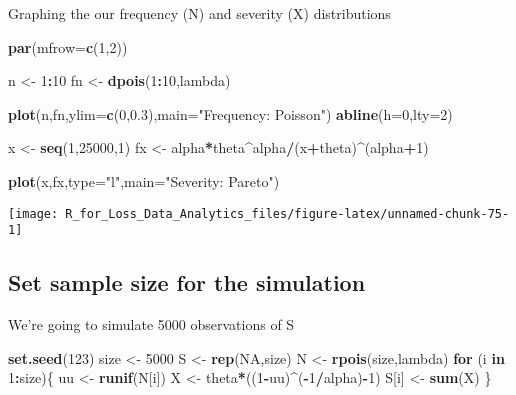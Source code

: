 \documentclass[]{book}
\newenvironment{Shaded}{\begin{snugshade}}{\end{snugshade}}
\newcommand{\KeywordTok}[1]{\textcolor[rgb]{0.13,0.29,0.53}{\textbf{#1}}}
\newcommand{\DataTypeTok}[1]{\textcolor[rgb]{0.13,0.29,0.53}{#1}}
\newcommand{\DecValTok}[1]{\textcolor[rgb]{0.00,0.00,0.81}{#1}}
\newcommand{\FloatTok}[1]{\textcolor[rgb]{0.00,0.00,0.81}{#1}}
\newcommand{\StringTok}[1]{\textcolor[rgb]{0.31,0.60,0.02}{#1}}
\newcommand{\OtherTok}[1]{\textcolor[rgb]{0.56,0.35,0.01}{#1}}
\newcommand{\ControlFlowTok}[1]{\textcolor[rgb]{0.13,0.29,0.53}{\textbf{#1}}}
\newcommand{\OperatorTok}[1]{\textcolor[rgb]{0.81,0.36,0.00}{\textbf{#1}}}
\newcommand{\NormalTok}[1]{#1}
\theoremstyle{definition}
\theoremstyle{definition}
\theoremstyle{definition}
\theoremstyle{remark}
\begin{document}
Graphing the our frequency (N) and severity (X) distributions

\begin{Shaded}
\begin{Highlighting}[]
\KeywordTok{par}\NormalTok{(}\DataTypeTok{mfrow=}\KeywordTok{c}\NormalTok{(}\DecValTok{1}\NormalTok{,}\DecValTok{2}\NormalTok{))}

\NormalTok{n <-}\StringTok{ }\DecValTok{1}\OperatorTok{:}\DecValTok{10}
\NormalTok{fn <-}\StringTok{ }\KeywordTok{dpois}\NormalTok{(}\DecValTok{1}\OperatorTok{:}\DecValTok{10}\NormalTok{,lambda)}

\KeywordTok{plot}\NormalTok{(n,fn,}\DataTypeTok{ylim=}\KeywordTok{c}\NormalTok{(}\DecValTok{0}\NormalTok{,}\FloatTok{0.3}\NormalTok{),}\DataTypeTok{main=}\StringTok{"Frequency: Poisson"}\NormalTok{)}
\KeywordTok{abline}\NormalTok{(}\DataTypeTok{h=}\DecValTok{0}\NormalTok{,}\DataTypeTok{lty=}\DecValTok{2}\NormalTok{)}

\NormalTok{x <-}\StringTok{ }\KeywordTok{seq}\NormalTok{(}\DecValTok{1}\NormalTok{,}\DecValTok{25000}\NormalTok{,}\DecValTok{1}\NormalTok{)}
\NormalTok{fx <-}\StringTok{ }\NormalTok{alpha}\OperatorTok{*}\NormalTok{theta}\OperatorTok{^}\NormalTok{alpha}\OperatorTok{/}\NormalTok{(x}\OperatorTok{+}\NormalTok{theta)}\OperatorTok{^}\NormalTok{(alpha}\OperatorTok{+}\DecValTok{1}\NormalTok{)}

\KeywordTok{plot}\NormalTok{(x,fx,}\DataTypeTok{type=}\StringTok{"l"}\NormalTok{,}\DataTypeTok{main=}\StringTok{"Severity: Pareto"}\NormalTok{)}
\end{Highlighting}
\end{Shaded}

\begin{center}\texttt{[image: R\_for\_Loss\_Data\_Analytics\_files/figure-latex/unnamed-chunk-75-1]} \end{center}

\subsection{Set sample size for the
simulation}\label{set-sample-size-for-the-simulation}

We're going to simulate 5000 observations of S

\begin{Shaded}
\begin{Highlighting}[]
\KeywordTok{set.seed}\NormalTok{(}\DecValTok{123}\NormalTok{)}
\NormalTok{size <-}\StringTok{ }\DecValTok{5000}
\NormalTok{S <-}\StringTok{ }\KeywordTok{rep}\NormalTok{(}\OtherTok{NA}\NormalTok{,size)}
\NormalTok{N <-}\StringTok{ }\KeywordTok{rpois}\NormalTok{(size,lambda)}
\ControlFlowTok{for}\NormalTok{ (i }\ControlFlowTok{in} \DecValTok{1}\OperatorTok{:}\NormalTok{size)\{}
\NormalTok{  uu <-}\StringTok{ }\KeywordTok{runif}\NormalTok{(N[i])}
\NormalTok{  X <-}\StringTok{ }\NormalTok{theta}\OperatorTok{*}\NormalTok{((}\DecValTok{1}\OperatorTok{-}\NormalTok{uu)}\OperatorTok{^}\NormalTok{(}\OperatorTok{-}\DecValTok{1}\OperatorTok{/}\NormalTok{alpha)}\OperatorTok{-}\DecValTok{1}\NormalTok{)}
\NormalTok{  S[i] <-}\StringTok{ }\KeywordTok{sum}\NormalTok{(X)}
\NormalTok{\}}
\end{Highlighting}
\end{Shaded}
\end{document}
